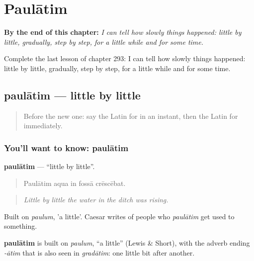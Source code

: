
\chapter{Paulātim}
\label{ch:la-paulatim}

\begin{chapteropening}
\textbf{By the end of this chapter:} \emph{I can tell how slowly things happened: little by little, gradually, step by step, for a little while and for some time.}

Complete the last lesson of chapter 293: I can tell how slowly things happened: little by little, gradually, step by step, for a little while and for some time.
\end{chapteropening}

\section[paulātim]{paulātim — little by little}

\label{lesson:LA-C293-paulatim}



\begin{quote}
Before the new one: say the Latin for in an instant, then the Latin for immediately.
\end{quote}

\subsection*{You'll want to know: paulātim}
\textbf{paulātim} — \textquotedblleft{}little by little\textquotedblright{}.

\begin{quote}
Paulātim aqua in fossā crēscēbat.
\end{quote}

\begin{quote}
\emph{Little by little the water in the ditch was rising.}
\end{quote}

Built on \emph{paulum}, 'a little'. Caesar writes of people who \emph{paulātim} get used to something.

\begin{cousinweb}
\textbf{paulātim} is built on \emph{paulum}, \textquotedblleft{}a little\textquotedblright{} (Lewis \& Short), with the adverb ending \emph{-ātim} that is also seen in \emph{gradātim}: one little bit after another.
\end{cousinweb}

